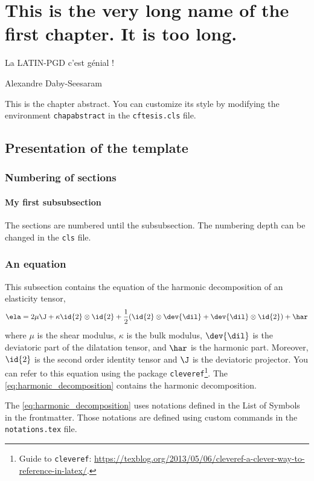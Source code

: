 \chapter[Short name of chapter]{This is the very long name of the first chapter. It is too long.}

{\color{Azul1FCQ} \epigraph{La LATIN-PGD c'est génial !}{Alexandre Daby-Seesaram}}

\begin{chapabstract}
    This is the chapter abstract. You can customize its style by modifying the environment \texttt{chapabstract} in the \texttt{cftesis.cls} file.
    \lipsum[1]
\end{chapabstract}

\minitoc

\section{Presentation of the template}%
\label{sec:presentation_of_the_template}

\subsection{Numbering of sections}
\label{sub:numbering_of_sections}

\subsubsection{My first subsubsection}
\label{ssub:my_first_subsubsection}

The sections are numbered until the subsubsection.
The numbering depth can be changed in the \texttt{cls} file.

\subsection{An equation}%
\label{sub:an_equation}

This subsection contains the equation of the harmonic decomposition of an elasticity tensor,
\begin{equation}\label{eq:harmonic_decomposition}
    \ela =
        2 \mu \J +
        \kappa \id{2} \otimes \id{2} +
        \frac{1}{2} (\id{2} \otimes \dev{\dil} + \dev{\dil} \otimes \id{2}) +
        \har
\end{equation}
where
    $\mu$ is the shear modulus,
    $\kappa$ is the bulk modulus,
    $\dev{\dil}$ is the deviatoric part of the dilatation tensor, and
    $\har$ is the harmonic part.
Moreover, $\id{2}$ is the second order identity tensor and $\J$ is the deviatoric projector.
You can refer to this equation using the package \texttt{cleveref}\footnote{Guide to \texttt{cleveref}: \url{https://texblog.org/2013/05/06/cleveref-a-clever-way-to-reference-in-latex/}.}.
The \cref{eq:harmonic_decomposition} contains the harmonic decomposition.
\begin{remark}
    The \cref{eq:harmonic_decomposition} uses notations defined in the List of Symbols in the frontmatter.
    Those notations are defined using custom commands in the \texttt{notations.tex} file.
\end{remark}


